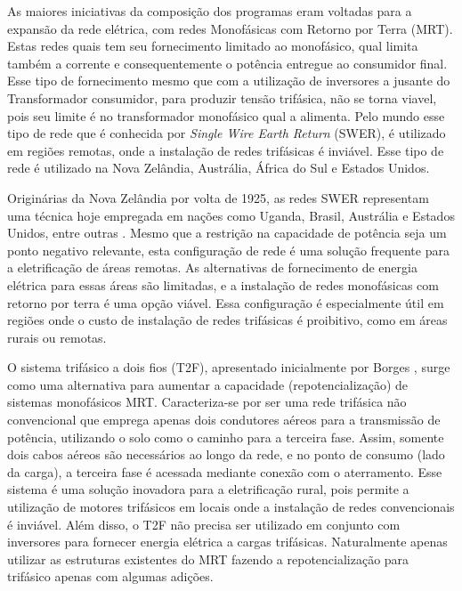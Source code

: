 \documentclass[oneside,openright,12pt]{ufsm_2021} %
\begin{document}
\par As maiores iniciativas da composição dos programas eram voltadas para a expansão da rede elétrica, com redes Monofásicas com Retorno por Terra (MRT). Estas redes quais tem seu fornecimento limitado ao monofásico, qual limita também a corrente e consequentemente o potência entregue ao consumidor final. Esse tipo de fornecimento mesmo que com a utilização de inversores a jusante do Transformador consumidor, para produzir tensão trifásica, não se torna viavel, pois seu limite é no transformador monofásico qual a alimenta. Pelo mundo esse tipo de rede que é conhecida por \textit{Single Wire Earth Return} (SWER), é utilizado em regiões remotas, onde a instalação de redes trifásicas é inviável. Esse tipo de rede é utilizado na Nova Zelândia, Austrália, África do Sul e Estados Unidos.

\par Originárias da Nova Zelândia por volta de 1925, as redes SWER representam uma técnica hoje empregada em nações como Uganda, Brasil, Austrália e Estados Unidos, entre outras \cite{mandeno_rural_1947}. Mesmo que a restrição na capacidade de potência seja um ponto negativo relevante, esta configuração de rede é uma solução frequente para a eletrificação de áreas remotas. As alternativas de fornecimento de energia elétrica para essas áreas são limitadas, e a instalação de redes monofásicas com retorno por terra é uma opção viável. Essa configuração é especialmente útil em regiões onde o custo de instalação de redes trifásicas é proibitivo, como em áreas rurais ou remotas.

\par O sistema trifásico a dois fios (T2F), apresentado inicialmente por Borges \citeyear{borges_repowering_2017}, surge como uma alternativa para aumentar a capacidade (repotencialização) de sistemas monofásicos MRT. Caracteriza-se por ser uma rede trifásica não convencional que emprega apenas dois condutores aéreos para a transmissão de potência, utilizando o solo como o caminho para a terceira fase. Assim, somente dois cabos aéreos são necessários ao longo da rede, e no ponto de consumo (lado da carga), a terceira fase é acessada mediante conexão com o aterramento. Esse sistema é uma solução inovadora para a eletrificação rural, pois permite a utilização de motores trifásicos em locais onde a instalação de redes convencionais é inviável. Além disso, o T2F não precisa ser utilizado em conjunto com inversores para fornecer energia elétrica a cargas trifásicas. Naturalmente apenas utilizar as estruturas existentes do MRT fazendo a repotencialização para trifásico apenas com algumas adições.
\end{document}

